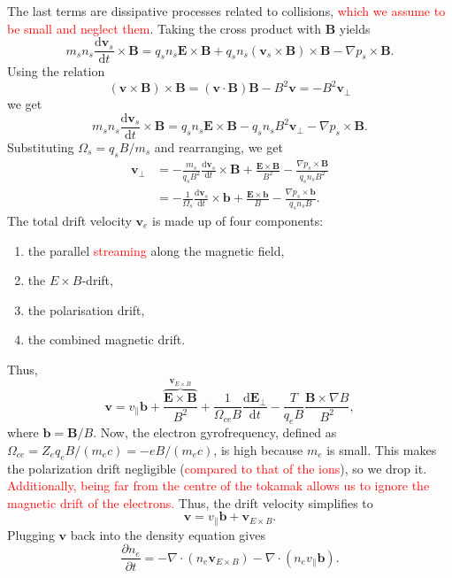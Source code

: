 \documentclass{article}
\begin{document}
%
The last terms are dissipative processes related to collisions, \textcolor{red}{which we assume to be small and neglect them}. Taking the cross product with $\bm{B}$ yields
%
\begin{equation}
    m_s n_s \frac{\mathrm{d} \bm{v}_s}{\mathrm{d} t} \times \bm{B} = q_s n_s \bm{E} \times \bm{B} + q_s n_s (\bm{v}_s \times \bm{B}) \times \bm{B} - \nabla p_s \times \bm{B} .
\end{equation}
%
Using the relation
%
\begin{equation}
    (\bm{v} \times \bm{B}) \times \bm{B} = (\bm{v} \cdot \bm{B}) \bm{B} - B^2 \bm{v} = - B^2 \bm{v}_\perp
\end{equation}
%
we get
%
\begin{equation}
    m_s n_s \frac{\mathrm{d} \bm{v}_s}{\mathrm{d} t} \times \bm{B} = q_s n_s \bm{E} \times \bm{B} - q_s n_s B^2 \bm{v}_\perp - \nabla p_s \times \bm{B} .
\end{equation}
%
Substituting $\Omega_s = q_s B / m_s$ and rearranging, we get
%
\begin{align}
    \bm{v}_\perp &= - \frac{m_s}{q_s B^2} \frac{\mathrm{d} \bm{v}_s}{\mathrm{d} t} \times \bm{B} + \frac{\bm{E} \times \bm{B}}{B^2} - \frac{\nabla p_s \times \bm{B}}{q_s n_s B^2} \\
    &= - \frac{1}{\Omega_s} \frac{\mathrm{d} \bm{v}_s}{\mathrm{d} t} \times \bm{b} + \frac{\bm{E} \times \bm{b}}{B} - \frac{\nabla p_s \times \bm{b}}{q_s n_s B} .
\end{align}
%
The total drift velocity $\bm{v}_e$ is made up of four components:
%
\begin{enumerate}
    \item the parallel \textcolor{red}{streaming} along the magnetic field,
    \item the $E \times B$-drift,
    \item the polarisation drift,
    \item the combined magnetic drift.
\end{enumerate}
%
Thus,
%
\begin{equation}
    \bm{v} = v_\parallel \bm{b} + \overbrace{\frac{\bm{E} \times \bm{B}}{B^2}}^{\bm{v}_{E \times B}} + \frac{1}{\Omega_{ce} B} \frac{\mathrm{d}\bm{E}_\perp}{\mathrm{d}t} - \frac{T}{q_e B} \frac{\bm{B} \times \nabla B}{B^2} ,
\end{equation}
%
where $\bm{b} = \bm{B} / B$. Now, the electron gyrofrequency, defined as $\Omega_{ce} = Z_e q_e B/(m_e c) = -e B/(m_e c)$, is high because $m_e$ is small. This makes the polarization drift negligible (\textcolor{red}{compared to that of the ions}), so we drop it. \textcolor{red}{Additionally, being far from the centre of the tokamak allows us to ignore the magnetic drift of the electrons.} Thus, the drift velocity simplifies to
%
\begin{equation}
    \bm{v} = v_\parallel \bm{b} + \bm{v}_{E \times B} .
\end{equation}
%
Plugging $\bm{v}$ back into the density equation gives
%
\begin{equation}
    \frac{\partial n_e}{\partial t} = - \nabla \cdot (n_e \bm{v}_{E \times B}) - \nabla \cdot (n_e v_\parallel \bm{b}) .
\end{equation}
\end{document}
